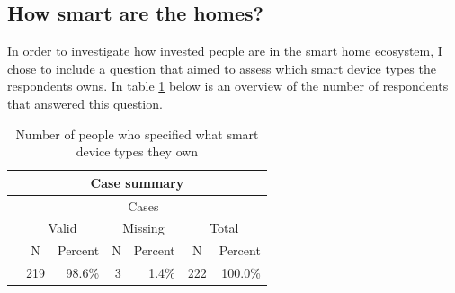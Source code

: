 \subsection{How smart are the homes?}
\label{howsmarthome}
In order to investigate how invested people are in the smart home ecosystem, I chose to include a question that aimed to assess which smart device types the respondents owns. In table \ref{tab:how_smart_N} below is an overview of the number of respondents that answered this question. 

\begin{table}[!h]
\centering
\begin{tabular}{|l|c|c|c|c|c|c|}
\hline
\multicolumn{7}{|c|}{{\color[HTML]{010205} \textbf{Case summary}}}                                                                                                                                                                                                                                                                                                              \\ \hline
{\color[HTML]{264A60} }                                      & \multicolumn{6}{c|}{{\color[HTML]{264A60} Cases}}                                                                                                                                                                                                                                                                \\ \cline{2-7} 
{\color[HTML]{264A60} }                                      & \multicolumn{2}{c|}{{\color[HTML]{264A60} Valid}}                                                    & \multicolumn{2}{c|}{{\color[HTML]{264A60} Missing}}                                               & \multicolumn{2}{c|}{{\color[HTML]{264A60} Total}}                                                     \\ \cline{2-7} 
\multirow{-3}{*}{{\color[HTML]{264A60} }}                    & {\color[HTML]{264A60} N}                        & {\color[HTML]{264A60} Percent}                     & {\color[HTML]{264A60} N}                      & {\color[HTML]{264A60} Percent}                    & {\color[HTML]{264A60} N}                        & {\color[HTML]{264A60} Percent}                      \\ \hline
\cellcolor[HTML]{E0E0E0}{\color[HTML]{264A60} Smart devices} & \multicolumn{1}{r|}{{\color[HTML]{010205} 219}} & \multicolumn{1}{r|}{{\color[HTML]{010205} 98.6\%}} & \multicolumn{1}{r|}{{\color[HTML]{010205} 3}} & \multicolumn{1}{r|}{{\color[HTML]{010205} 1.4\%}} & \multicolumn{1}{r|}{{\color[HTML]{010205} 222}} & \multicolumn{1}{r|}{{\color[HTML]{010205} 100.0\%}} \\ \hline
\end{tabular}
\caption{Number of people who specified what smart device types they own}
\label{tab:how_smart_N}
\end{table}

